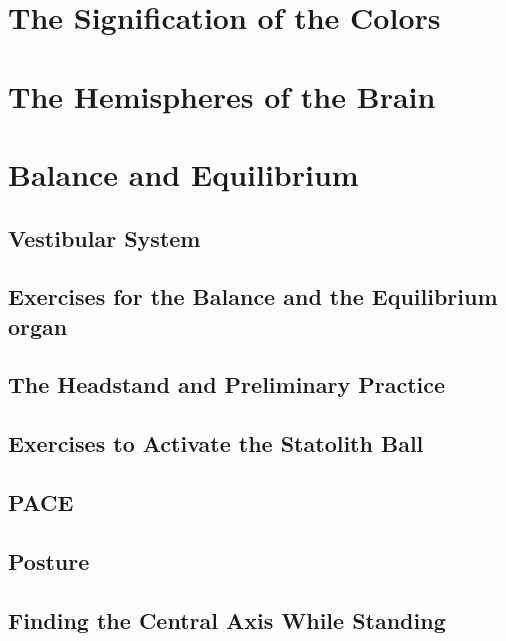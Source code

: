 \documentclass[../main.tex]{subfiles}
\begin{document}




\chapter{The Signification of the Colors}



\chapter{The Hemispheres of the Brain}



\chapter{Balance and Equilibrium}



\section{Vestibular System}



\newpage
\section[Balance Exercises]{Exercises for the Balance and the Equilibrium organ}



\section[Headstand]{The Headstand and Preliminary Practice}



\section{Exercises to Activate the Statolith Ball}



\section{PACE}





\section{Posture}



\section{Finding the Central Axis While Standing}


\end{document}
